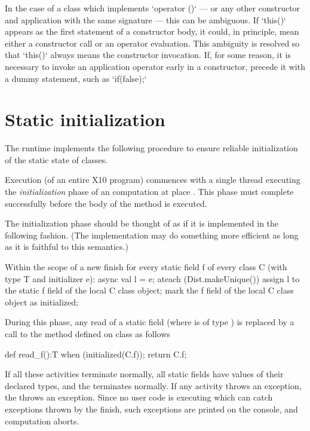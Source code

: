 In the case of a class which implements \xcd`operator ()` 
--- or any other constructor and application with the same signature --- 
this can be ambiguous.  If \xcd`this()` appears as the first statement of a
constructor body, it could, in principle, mean either a constructor call or an
operator evaluation.   This ambiguity is resolved so that \xcd`this()` always
means the constructor invocation.  If, for some reason, it is necessary to
invoke an application operator early in a constructor, precede it with a dummy
statement, such as \xcd`if(false);`  

\section{Static initialization}
\label{StaticInitialization}
The \Xten{} runtime implements the following procedure to ensure
reliable initialization of the static state of classes.


Execution (of an entire X10 program) commences with a single thread executing
the 
\emph{initialization} phase of an \Xten{} computation at place . This
phase must complete successfully before the body of the  method is
executed.

The initialization phase should be thought of as if it is implemented in
the following fashion. (The implementation may do something more
efficient as long as it is faithful to this semantics.)

\begin{xten}
Within the scope of a new finish
for every static field f of every class C 
   (with type T and initializer e):
async {
  val l = e; 
  ateach (Dist.makeUnique()) {
     assign l to the static f field of 
         the local C class object;
     mark the f field of the local C 
         class object as initialized;
  }
}
\end{xten}

During this phase, any read of a static field  (where  is of type )
is replaced by a call to the method  defined on class 
as follows

\begin{xten}
def read_f():T {
   when (initialized(C.f)){};
   return C.f;
}
\end{xten}
 

If all these activities terminate normally, all static fields have values of
their declared types, 
and the  terminates normally. If
any activity throws an exception, the  throws an
exception. Since no user code is executing which can catch exceptions
thrown by the finish, such exceptions are printed on the console, and
computation aborts.


